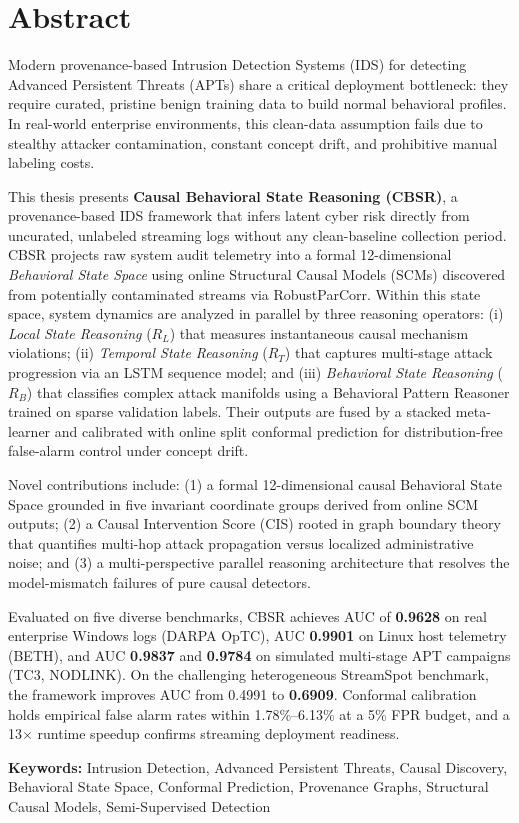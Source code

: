 \chapter*{Abstract}

Modern provenance-based Intrusion Detection Systems (IDS) for detecting Advanced Persistent
Threats (APTs) share a critical deployment bottleneck: they require curated, pristine benign
training data to build normal behavioral profiles. In real-world enterprise environments, this
clean-data assumption fails due to stealthy attacker contamination, constant concept drift, and
prohibitive manual labeling costs.

This thesis presents \textbf{Causal Behavioral State Reasoning (CBSR)}, a provenance-based IDS
framework that infers latent cyber risk directly from uncurated, unlabeled streaming logs without
any clean-baseline collection period. CBSR projects raw system audit telemetry into a formal
12-dimensional \emph{Behavioral State Space} using online Structural Causal Models (SCMs)
discovered from potentially contaminated streams via RobustParCorr. Within this state space,
system dynamics are analyzed in parallel by three reasoning operators: (i) \emph{Local State
Reasoning} ($R_L$) that measures instantaneous causal mechanism violations; (ii) \emph{Temporal
State Reasoning} ($R_T$) that captures multi-stage attack progression via an LSTM sequence
model; and (iii) \emph{Behavioral State Reasoning} ($R_B$) that classifies complex attack
manifolds using a Behavioral Pattern Reasoner trained on sparse validation labels. Their outputs
are fused by a stacked meta-learner and calibrated with online split conformal prediction for
distribution-free false-alarm control under concept drift.

Novel contributions include: (1) a formal 12-dimensional causal Behavioral State Space grounded
in five invariant coordinate groups derived from online SCM outputs; (2) a Causal Intervention
Score (CIS) rooted in graph boundary theory that quantifies multi-hop attack propagation versus
localized administrative noise; and (3) a multi-perspective parallel reasoning architecture
that resolves the model-mismatch failures of pure causal detectors.

Evaluated on five diverse benchmarks, CBSR achieves AUC of \textbf{0.9628} on real enterprise
Windows logs (DARPA OpTC), AUC \textbf{0.9901} on Linux host telemetry (BETH), and AUC
\textbf{0.9837} and \textbf{0.9784} on simulated multi-stage APT campaigns (TC3, NODLINK). On the challenging
heterogeneous StreamSpot benchmark, the framework improves AUC from 0.4991 to \textbf{0.6909}.
Conformal calibration holds empirical false alarm rates within 1.78\%--6.13\% at a 5\% FPR
budget, and a 13$\times$ runtime speedup confirms streaming deployment readiness.

\vspace{0.5cm}
\noindent\textbf{Keywords:} Intrusion Detection, Advanced Persistent Threats, Causal Discovery,
Behavioral State Space, Conformal Prediction, Provenance Graphs, Structural Causal Models,
Semi-Supervised Detection
